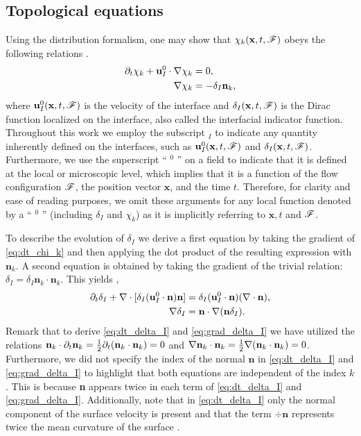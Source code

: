\subsection{Topological equations}
Using the distribution formalism, one may show that $\chi_k(\textbf{x},t,\mathscr{F})$ obeys the following relations \citep{drew1983mathematical,orlando2023evolution}. 
\begin{align}
    \partial_t \chi_k
    + \textbf{u}_I^0 \cdot \mathbf{\nabla} \chi_k
    &= 0,
    \label{eq:dt_chi_k}\\
    \label{eq:grad_chi_k}
    \mathbf{\nabla} \chi_k
    &= - \delta_I \textbf{n}_k, 
\end{align}
where $\textbf{u}^0_I(\textbf{x},t,\mathscr{F})$ is the velocity of the interface and $\delta_I(\textbf{x},t,\mathscr{F})$ is the Dirac function localized on the interface, also called the interfacial indicator function.
Throughout this work we employ the subscript $_I$ to indicate any quantity inherently defined on the interfaces, such as $\textbf{u}_I^0(\textbf{x},t,\mathscr{F})$ and $\delta_I(\textbf{x},t,\mathscr{F})$. 
Furthermore, we use the superscript `` $^0$ '' on a field to indicate that it is defined at the local or microscopic level, which implies that it is a function of the flow configuration $\mathscr{F}$, the position vector $\textbf{x}$, and the time $t$. 
Therefore, for clarity and ease of reading purposes, we omit these arguments for any local function denoted by a `` $^0$ '' (including $\delta_I$ and $\chi_k$) as it is implicitly referring to $\textbf{x},t$ and $\mathscr{F}$.

To describe the evolution of $\delta_I$ we derive a first equation by taking the gradient of \ref{eq:dt_chi_k} and then applying the dot product of the resulting expression with $\textbf{n}_k$.
A second equation is obtained by taking the gradient of the trivial relation: $\delta_I = \delta_I \textbf{n}_k\cdot \textbf{n}_k$.
This yields \citep{morel2007surface,orlando2023evolution}, 
\begin{align}
    \partial_t \delta_I
    + \mathbf{\nabla}\cdot [\delta_I (\textbf{u}_I^0\cdot \textbf{n}) \textbf{n}]
    &= \delta_I (\textbf{u}_I^0 \cdot \textbf{n})(\mathbf{\nabla}\cdot\textbf{n}),
    \label{eq:dt_delta_I}\\
    \mathbf{\nabla}\delta_I 
    &= \textbf{n} \cdot \mathbf{\nabla} (\textbf{n} \delta_I).
    \label{eq:grad_delta_I}
\end{align} 
Remark that to derive \ref{eq:dt_delta_I} and \ref{eq:grad_delta_I} we have utilized the relations $\textbf{n}_k\cdot \partial_t\textbf{n}_k= \frac{1}{2}\partial_t(\textbf{n}_k\cdot \textbf{n}_k) = 0$ and $\mathbf{\nabla} \textbf{n}_k \cdot \textbf{n}_k =\frac{1}{2} \mathbf{\nabla}(\textbf{n}_k\cdot \textbf{n}_k) = 0$. 
Furthermore, we did not specify the index of the normal $\textbf{n}$ in \ref{eq:dt_delta_I} and \ref{eq:grad_delta_I} to highlight that both equations are independent of the index $k$. 
This is because \textbf{n} appears twice in each term of \ref{eq:dt_delta_I} and \ref{eq:grad_delta_I}.
Additionally, note that in \ref{eq:dt_delta_I} only the normal component of the surface velocity is present and that the term $\div \textbf{n}$ represents twice the mean curvature of the surface \citep{aris2012vectors}. 

